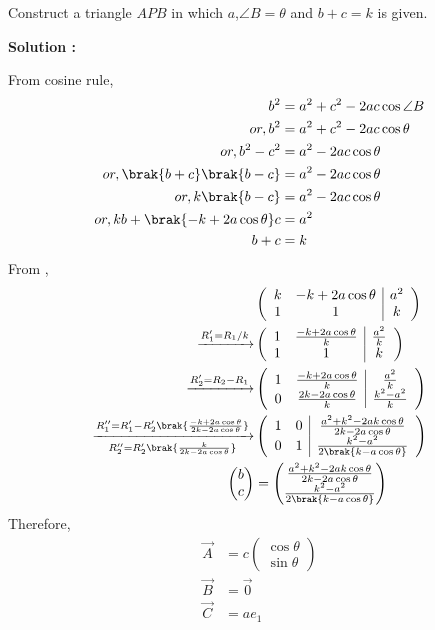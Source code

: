  Construct a triangle $APB$ in which $a$,$\angle B = \theta$ and $b+c= k$ is given.


\textbf{Solution :}

From cosine rule,
\begin{align}
  b^2&=a^2+c^2-2ac\cos{\angle B} \\
  or,b^2&=a^2+c^2-2ac\cos{\theta}\\
  or,b^2-c^2 &=a^2-2ac\cos{\theta}\\
  or,\brak{b+c}\brak{b-c}&=a^2-2ac\cos{\theta}\\
  or,k\brak{b-c}&=a^2-2ac\cos{\theta}\\
  or,kb+\brak{-k+2a\cos{\theta}}c&=a^2\\
  b+c&=k\end{align}
From ,
\begin{align}
&\begin{pmatrix}
\begin{array}{cc|c}
k&-k+2a\cos{\theta}&a^2\\
1&1&k\end{array}
\end{pmatrix}\\
\xrightarrow{R_1'=R_1/k}&\begin{pmatrix}
\begin{array}{cc|c}
1&\frac{-k+2a\cos{\theta}}{k}&\frac{a^2}{k}\\
1&1&k\end{array}
\end{pmatrix}\\
 \xrightarrow{R_2'= R_2-R_1}&\begin{pmatrix}
\begin{array}{cc|c}
1&\frac{-k+2a\cos{\theta}}{k}&\frac{a^2}{k}\\
0&\frac{2k-2a\cos{\theta}}{k}&\frac{k^2-a^2}{k}\end{array}
\end{pmatrix}\\
  \xrightarrow[R_2''=R_2'\brak{\frac{k}{2k-2a\cos{\theta}}}]{R_1''= R_1'-R_2'\brak{\frac{-k+2a\cos{\theta}}{2k-2a\cos{\theta}}}}&\begin{pmatrix}
\begin{array}{cc|c}
1&0&\frac{a^2+k^2-2ak\cos{\theta}}{2k-2a\cos{\theta}}\\
0&1&\frac{k^2-a^2}{2\brak{k-a\cos{\theta}}}\end{array}
\end{pmatrix}\\
 \begin{pmatrix}
     b\\c
 \end{pmatrix}&=\begin{pmatrix}
   \frac{a^2+k^2-2ak\cos{\theta}}{2k-2a\cos{\theta}}\\\frac{k^2-a^2}{2\brak{k-a\cos{\theta}}}
 \end{pmatrix}
\end{align}
Therefore,
\begin{align}
    \Vec{A}&=c\begin{pmatrix}
        \cos{\theta}\\\sin{\theta}
    \end{pmatrix}\\
    \Vec{B}&=\Vec{0}\\
    \Vec{C}&=ae_1
\end{align}


